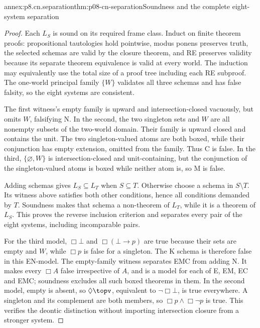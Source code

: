 \begin{annexitem}{annex:p8.cn.separation}{thm:p08-cn-separation}{Soundness and the complete eight-system separation}
\begin{proof}
Each \(L_S\) is sound on its required frame class. Induct on
finite theorem proofs: propositional tautologies hold pointwise,
modus ponens preserves truth, the selected schemas are valid by
the closure theorem, and RE preserves validity because its separate
theorem equivalence is valid at every world. The induction may
equivalently use the total size of a proof tree including each RE
subproof. The one-world principal family \(\{W\}\) validates
all three schemas and has false falsity, so the eight systems are
consistent.

The first witness's empty family is upward and intersection-closed
vacuously, but omits \(W\), falsifying N. In the second,
the two singleton sets and \(W\) are all nonempty subsets of
the two-world domain. Their family is upward closed and contains
the unit. The two singleton-valued atoms are both boxed, while
their conjunction has empty extension, omitted from the family.
Thus C is false. In the third, \(\{\varnothing,W\}\)
is intersection-closed and unit-containing, but the conjunction
of the singleton-valued atoms is boxed while neither atom is,
so M is false.

Adding schemas gives \(L_S\subseteq L_T\) when
\(S\subseteq T\). Otherwise choose a schema in \(S\setminus T\).
Its witness above satisfies both other conditions, hence all
conditions demanded by \(T\). Soundness makes that schema a
non-theorem of \(L_T\), while it is a theorem of \(L_S\).
This proves the reverse inclusion criterion and separates every
pair of the eight systems, including incomparable pairs.

For the third model, \(\Box\bot\) and
\(\Box(\bot\to p)\) are true because their sets are empty
and \(W\), while \(\Box p\) is false for a singleton.
The K schema is therefore false in this EN-model. The empty-family
witness separates EMC from adding N. It makes every \(\Box A\)
false irrespective of \(A\), and is a model for each of E, EM,
EC and EMC; soundness excludes all such boxed theorems in them.
In the second model, empty is absent, so
\(\Diamond\topv\), equivalent to \(\neg\Box\bot\),
is true everywhere. A singleton and its complement are both
members, so \(\Box p\land\Box\neg p\) is true.
This verifies the deontic distinction without importing intersection
closure from a stronger system.
\end{proof}
\end{annexitem}


